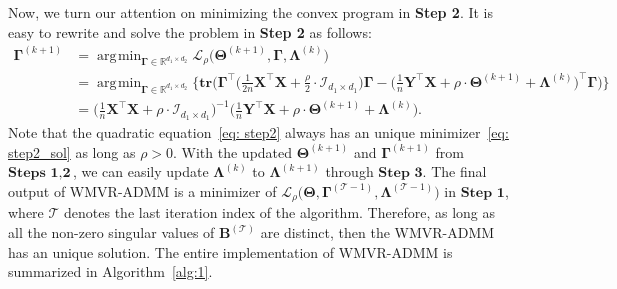 \documentclass[alpha-refs]{wiley-article}
\DeclareMathOperator*{\argmin}{\arg\!\min}
\begin{document}
Now, we turn our attention on minimizing the convex program in \textbf{Step 2}.
It is easy to rewrite and solve the problem in \textbf{Step 2} as follows:
\begin{align}
    \boldsymbol{\Gamma}^{(k+1)}
    &= \argmin_{\boldsymbol{\Gamma}\in\mathbb{R}^{d_{1} \times d_{2}}} \mathcal{L}_{\rho} \big( \boldsymbol{\Theta}^{(k+1)},\boldsymbol{\Gamma},\boldsymbol{\Lambda}^{(k)} \big) \nonumber \\
    &= \argmin_{\boldsymbol{\Gamma}\in\mathbb{R}^{d_{1} \times d_{2}}} \bigg\{ \textbf{tr} \bigg( \boldsymbol{\Gamma}^{\top}\bigg(\frac{1}{2n}\boldsymbol{X}^{\top}\boldsymbol{X} + \frac{\rho}{2} \cdot \mathcal{I}_{d_{1} \times d_{1}} \bigg) \boldsymbol{\Gamma} - \bigg( \frac{1}{n}\boldsymbol{Y}^{\top}\boldsymbol{X} + \rho \cdot \boldsymbol{\Theta}^{(k+1)} + \boldsymbol{\Lambda}^{(k)} \bigg)^{\top} \boldsymbol{\Gamma} \bigg) \bigg\} \label{eq: step2} \\
    &= \bigg( \frac{1}{n}\boldsymbol{X}^{\top}\boldsymbol{X}+\rho\cdot\mathcal{I}_{d_{1} \times d_{1}} \bigg)^{-1}\bigg( \frac{1}{n}\boldsymbol{Y}^{\top}\boldsymbol{X} +\rho \cdot \boldsymbol{\Theta}^{(k+1)} + \boldsymbol{\Lambda}^{(k)} \bigg). \label{eq: step2_sol}
\end{align}
Note that the quadratic equation~\eqref{eq: step2} always has an unique minimizer~\eqref{eq: step2_sol} as long as $\rho>0$.
With the updated $\boldsymbol{\Theta}^{(k+1)}$ and $\boldsymbol{\Gamma}^{(k+1)}$ from $\textbf{Steps 1}, \textbf{2}$, we can easily update $\boldsymbol{\Lambda}^{(k)}$ to $\boldsymbol{\Lambda}^{(k+1)}$ through $\textbf{Step 3}$.
The final output of WMVR-ADMM is a minimizer of $\mathcal{L}_{\rho} \big( \boldsymbol{\Theta},\boldsymbol{\Gamma}^{(\mathcal{T}-1)},\boldsymbol{\Lambda}^{(\mathcal{T}-1)}\big)$ in $\textbf{Step 1}$, where $\mathcal{T}$ denotes the last iteration index of the algorithm.
Therefore, as long as all the non-zero singular values of $\boldsymbol{B}^{(\mathcal{T})}$ are distinct, then the WMVR-ADMM has an unique solution.
The entire implementation of WMVR-ADMM is summarized in Algorithm~\ref{alg:1}.
\end{document}
